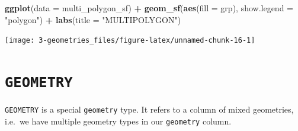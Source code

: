 \documentclass[
]{report}
\newenvironment{Shaded}{\begin{snugshade}}{\end{snugshade}}
\newcommand{\DataTypeTok}[1]{\textcolor[rgb]{0.13,0.29,0.53}{#1}}
\newcommand{\KeywordTok}[1]{\textcolor[rgb]{0.13,0.29,0.53}{\textbf{#1}}}
\newcommand{\NormalTok}[1]{#1}
\newcommand{\OperatorTok}[1]{\textcolor[rgb]{0.81,0.36,0.00}{\textbf{#1}}}
\newcommand{\StringTok}[1]{\textcolor[rgb]{0.31,0.60,0.02}{#1}}
\begin{document}
\begin{Shaded}
\begin{Highlighting}[]
\KeywordTok{ggplot}\NormalTok{(}\DataTypeTok{data =}\NormalTok{ multi\_polygon\_sf) }\OperatorTok{+}
\StringTok{  }\KeywordTok{geom\_sf}\NormalTok{(}\KeywordTok{aes}\NormalTok{(}\DataTypeTok{fill =}\NormalTok{ grp), }\DataTypeTok{show.legend =} \StringTok{"polygon"}\NormalTok{) }\OperatorTok{+}
\StringTok{  }\KeywordTok{labs}\NormalTok{(}\DataTypeTok{title =} \StringTok{"MULTIPOLYGON"}\NormalTok{)}
\end{Highlighting}
\end{Shaded}

\begin{center}\texttt{[image: 3-geometries\_files/figure-latex/unnamed-chunk-16-1]} \end{center}

\hypertarget{geometry}{%
\section{\texorpdfstring{\texttt{GEOMETRY}}{GEOMETRY}}\label{geometry}}

\texttt{GEOMETRY} is a special \texttt{geometry} type. It refers to a column of mixed geometries, i.e.~we have multiple geometry types in our \texttt{geometry} column.
\end{document}
